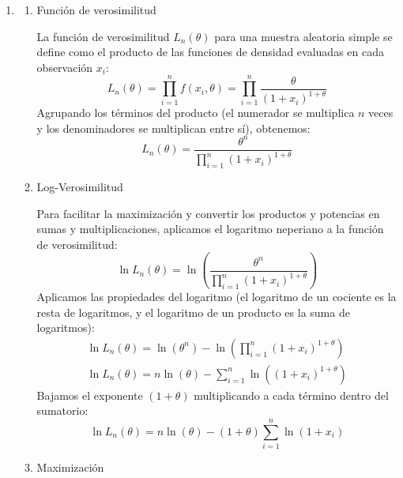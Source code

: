 \begin{enumerate}[label=\color{red}\textbf{\arabic*)}]
\begin{enumerate}[label=\arabic*)]
		            Para encontrar el máximo, calculamos la derivada de la log-verosimilitud con respecto a $\theta$ y la igualamos a cero: \[
			            \dfrac{\mathrm{d}}{\mathrm{d}\theta}\ln L_n(\theta)=0+0-\dfrac{n}{\theta}- \left( -\dfrac{1}{\theta^2} \right) \sum_{i=1}^{n} x_i^2=-\dfrac{n}{\theta}+\dfrac{1}{\theta^2}\sum_{i=1}^{n} x_i^2=0
		            \]
		            Despejamos $\theta$: \[
			            \dfrac{n}{\theta}=\dfrac{1}{\theta^2}\sum_{i=1}^{n} x_i^2 \implies n\theta=\sum_{i=1}^{n} x_i^2 \implies\theta=\dfrac{1}{n}\sum_{i=1}^{n} x_i^2
		            \]
	      \end{enumerate}
	      \textbf{Conclusión}

	      Por lo tanto, el estimador de máxima verosimilitud para el parámetro $\theta$ es el momento muestral de orden 2: \[
		      \hat{\theta}_{EMV}=\dfrac{1}{n}\sum_{i=1}^{n} X_i^2=\bar{X^2}
	      \]
	\item {}
	      \begin{enumerate}[label=\arabic*)]
		      \item Función de verosimilitud

		            La función de verosimilitud $L_n(\theta)$ para una muestra aleatoria simple se define como el producto de las funciones de densidad evaluadas en cada observación $x_i$: \[
			            L_n(\theta)=\prod_{i=1}^{n} f(x_i,\theta)=\prod_{i=1}^{n} \dfrac{\theta}{(1+x_i)^{1+\theta}}
		            \]
		            Agrupando los términos del producto (el numerador se multiplica $n$ veces y los denominadores se multiplican entre sí), obtenemos: \[
			            L_n(\theta)=\dfrac{\theta^n}{\prod_{i=1}^{n} (1+x_i)^{1+\theta} }
		            \]
		      \item Log-Verosimilitud

		            Para facilitar la maximización y convertir los productos y potencias en sumas y multiplicaciones, aplicamos el logaritmo neperiano a la función de verosimilitud: \[
			            \ln L_n(\theta)=\ln \left( \dfrac{\theta^n}{\prod_{i=1}^{n} (1+x_i)^{1+\theta} } \right)
		            \]
		            Aplicamos las propiedades del logaritmo (el logaritmo de un cociente es la resta de logaritmos, y el logaritmo de un producto es la suma de logaritmos):
		            \[
			            \begin{array}{c}
				            \ln L_n(\theta)=\ln(\theta^n)-\ln \left( \prod_{i=1}^{n} (1+x_i)^{1+\theta} \right) \\
				            \ln L_n(\theta)=n \ln(\theta)-\sum_{i=1}^{n} \ln \left( (1+x_i)^{1+\theta} \right)
			            \end{array}
		            \]
		            Bajamos el exponente $(1+\theta)$ multiplicando a cada término dentro del sumatorio: \[
			            \ln L_n(\theta)=n\ln(\theta)-(1+\theta)\sum_{i=1}^{n} \ln(1+x_i)
		            \]
		      \item Maximización


\end{enumerate}
\end{enumerate}
